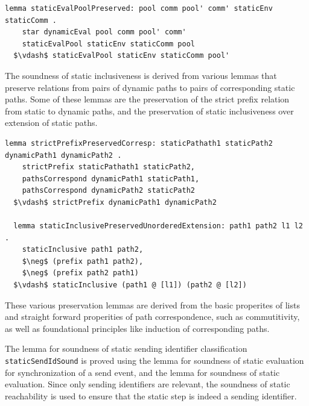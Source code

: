 \documentclass[letterpaper, 11pt]{extarticle}
\begin{document}
\begin{lstlisting}[language=logic, mathescape]
  lemma staticEvalPoolPreserved: pool comm pool' comm' staticEnv staticComm .
    star dynamicEval pool comm pool' comm' 
    staticEvalPool staticEnv staticComm pool
  $\vdash$ staticEvalPool staticEnv staticComm pool'
\end{lstlisting}

The soundness of static inclusiveness is derived from various lemmas that
preserve relations from pairs of dynamic paths to pairs of corresponding static paths. 
Some of these lemmas are
the preservation of the strict prefix relation from static to dynamic paths,
and the preservation of static inclusiveness over extension of static paths.

\begin{lstlisting}[language=logic, mathescape]
  lemma strictPrefixPreservedCorresp: staticPathath1 staticPath2 dynamicPath1 dynamicPath2 .
    strictPrefix staticPathath1 staticPath2, 
    pathsCorrespond dynamicPath1 staticPath1,
    pathsCorrespond dynamicPath2 staticPath2
  $\vdash$ strictPrefix dynamicPath1 dynamicPath2

  lemma staticInclusivePreservedUnorderedExtension: path1 path2 l1 l2 .
    staticInclusive path1 path2, 
    $\neg$ (prefix path1 path2),
    $\neg$ (prefix path2 path1)
  $\vdash$ staticInclusive (path1 @ [l1]) (path2 @ [l2])
\end{lstlisting}

These various preservation lemmas are derived from the basic properites of lists 
and straight forward properities of path correspondence, such as commutitivity, as
well as foundational principles like induction of corresponding paths.

The lemma for soundness of static sending identifier classification \lstinline{staticSendIdSound}
is proved using the lemma for soundness of static evaluation for synchronization of a send event,
and the lemma for soundness of static evaluation.
Since only sending identifiers are relevant,
the soundness of static reachability is
used to ensure that the static step is indeed a sending identifier. 
\end{document}
